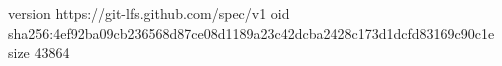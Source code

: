version https://git-lfs.github.com/spec/v1
oid sha256:4ef92ba09cb236568d87ce08d1189a23c42dcba2428c173d1dcfd83169c90c1e
size 43864
